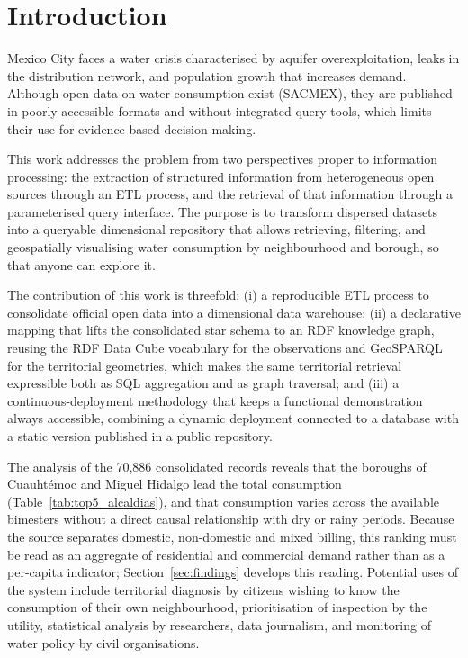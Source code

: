 \documentclass[runningheads]{llncs}
\renewcommand{\_}{\origunderscore\allowbreak}
\newif\ifshowchanges
\newcommand{\new}[1]{\ifshowchanges\textcolor{chg}{#1}\else#1\fi}
\begin{document}
\section{Introduction}
\label{sec:intro}

Mexico City faces a water crisis characterised by aquifer overexploitation, leaks
in the distribution network, and population growth that increases demand.
Although open data on water consumption exist (SACMEX), they are published in
poorly accessible formats and without integrated query tools, which limits their
use for evidence-based decision making.

This work addresses the problem from two perspectives proper to information
processing: the extraction of structured information from heterogeneous open
sources through an ETL process, and the retrieval of that information through a
parameterised query interface. The purpose is to transform dispersed datasets
into a queryable dimensional repository that allows retrieving, filtering, and
geospatially visualising water consumption by neighbourhood and borough, so that
anyone can explore it.

The contribution of this work is \new{threefold}: (i) a reproducible ETL process
to consolidate official open data into a dimensional data warehouse;
\new{(ii) a declarative mapping that lifts the consolidated star schema to an
RDF knowledge graph, reusing the RDF Data Cube vocabulary for the observations
and GeoSPARQL for the territorial geometries, which makes the same territorial
retrieval expressible both as SQL aggregation and as graph traversal;} and
\new{(iii)} a continuous-deployment methodology that keeps a functional
demonstration always accessible, combining a dynamic deployment connected to a
database with a static version published in a public repository.

The analysis of the 70,886 consolidated records reveals that the boroughs of
Cuauht\'emoc and Miguel Hidalgo lead the total consumption
(Table~\ref{tab:top5_alcaldias}), and that consumption varies across the
available bimesters without a direct causal relationship with dry or rainy
periods. \new{Because the source separates domestic, non-domestic and mixed
billing, this ranking must be read as an aggregate of residential and commercial
demand rather than as a per-capita indicator; Section~\ref{sec:findings}
develops this reading.} Potential uses of the system include territorial diagnosis by citizens wishing
to know the consumption of their own neighbourhood, prioritisation of inspection
by the utility, statistical analysis by researchers, data journalism, and
monitoring of water policy by civil organisations.
\end{document}
